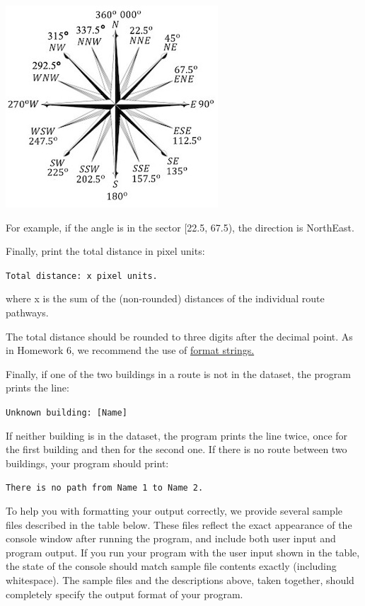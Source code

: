 \documentclass[11pt]{article}
\begin{document}
\includegraphics[scale=2]{compass.png}

\noindent For example, if the angle is in the sector [22.5, 67.5), the direction is NorthEast.

\noindent Finally, print the total distance in pixel units:

\noindent \texttt{Total distance: x pixel units.}

\noindent where x is the sum of the (non-rounded) distances of the individual route pathways.

\noindent The total distance should be rounded to three digits after the decimal point. As in Homework 6, we recommend the use of \href{https://docs.oracle.com/javase/8/docs/api/java/util/Formatter.html}{format strings.}

\noindent Finally, if one of the two buildings in a route is not in the dataset, the program prints the line:

\noindent \texttt{Unknown building: [Name]}

\noindent If neither building is in the dataset, the program prints the line twice, once for the first building and then for the second one. If there is no route between two buildings, your program should print:

\texttt{There is no path from Name 1 to Name 2.}

To help you with formatting your output correctly, we provide several sample files described in the table below. These files reflect the exact appearance of the console window after running the program, and include both user input and program output. If you run your program with the user input shown in the table, the state of the console should match sample file contents exactly (including whitespace). The sample files and the descriptions above, taken together, should completely specify the output format of your program.
\end{document}
